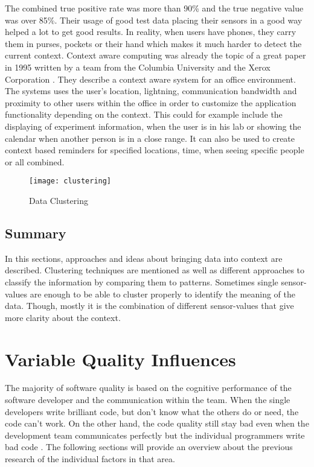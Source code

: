 The combined true positive rate was more than 90\% and the true negative value was over 85\%. Their usage of good test data placing their sensors in a good way helped a lot to get good results. In reality, when users have phones, they carry them in purses, pockets or their hand which makes it much harder to detect the current context.
Context aware computing was already the topic of a great paper in 1995 written by a team from the Columbia University and the Xerox Corporation \cite{schilit1994context}. They describe a context aware system for an office environment. The systems uses the user's location, lightning, communication bandwidth and proximity to other users within the office in order to customize the application functionality depending on the context. This could for example include the displaying of experiment information, when the user is in his lab or showing the calendar when another person is in a close range. It can also be used to create context based reminders for specified locations, time, when seeing specific people or all combined. 

\begin{figure}
\texttt{[image: clustering]}
\caption{Data Clustering \cite{korpipaa2003bayesian}}\label{clustering}
\vspace{2 mm}
\end{figure}

\FloatBarrier

\subsection{Summary} 
In this sections, approaches and ideas about bringing data into context are described. Clustering techniques are mentioned as well as different approaches to classify the information by comparing them to patterns. Sometimes single sensor-values are enough to be able to cluster properly to identify the meaning of the data. Though, mostly it is the combination of different sensor-values that give more clarity about the context.


\section{Variable Quality Influences}
The majority of software quality is based on the cognitive performance of the software developer and the communication within the team. 
When the single developers write brilliant code, but don't know what the others do or need, the code can't work. On the other hand, the code quality still stay bad even when the development team communicates perfectly but the individual programmers write bad code \cite{moe2010teamwork}. The following sections will provide an overview about the previous research of the individual factors in that area. 

